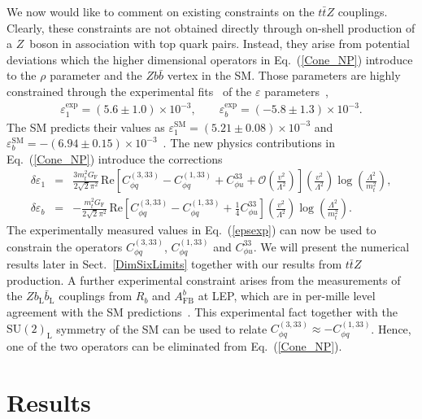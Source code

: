 \documentclass{JHEP3}
\def\ttbZ{t\bar{t}Z}
\newcommand{\be}{\begin{eqnarray}}
\newcommand{\ee}{\end{eqnarray}}
\begin{document}
We now would like to comment on existing constraints on the $\ttbZ$ couplings.
Clearly, these constraints are not obtained directly through on-shell production of a $Z$~boson in association with top quark pairs.
Instead, they arise from potential deviations which the higher dimensional operators in Eq.~(\ref{Cone_NP}) introduce to the $\rho$ parameter and the $Z b \bar{b}$ vertex in the SM.
Those parameters are highly constrained through the experimental fits~\cite{Ciuchini:2013pca} of the $\varepsilon$ parameters~\cite{Altarelli:1990zd,Altarelli:1991fk,Altarelli:1993sz},
\be
   \label{epsexp}
   \varepsilon_1^\mathrm{exp} = (5.6 \pm 1.0) \times 10^{-3}, \quad \quad \varepsilon_b^\mathrm{exp} = (-5.8 \pm 1.3) \times 10^{-3}.
\ee
The SM predicts their values as $\varepsilon_1^\mathrm{SM} = (5.21 \pm 0.08) \times 10^{-3} $ and
$\varepsilon_b^\mathrm{SM} = -(6.94 \pm 0.15) \times 10^{-3}$~\cite{Ciuchini:2013pca}.
The new physics contributions in Eq.~(\ref{Cone_NP}) introduce the corrections~\cite{Larios:1999au}
\be
   \delta \varepsilon_1 &=& \frac{3 m_t^2 G_\mathrm{F}}{2\sqrt{2}\pi^2}  
   \, \mathrm{Re}\left[  C^{(3,33)}_{\phi q}-C^{(1,33)}_{\phi q} + C^{33}_{\phi u} + \mathcal{O}\left(\frac{v^2}{\Lambda^2} \right) \right]
   \left( \frac{v^2}{\Lambda^2} \right) \log\left(\frac{\Lambda^2}{m_t^2}\right),
   \\
   \delta \varepsilon_b &=& -\frac{m_t^2 G_\mathrm{F}}{2\sqrt{2}\pi^2} 
   \, \mathrm{Re}\left[  C^{(3,33)}_{\phi q}-C^{(1,33)}_{\phi q} + \frac14 C^{33}_{\phi u}  \right]
   \left( \frac{v^2}{\Lambda^2} \right)\log\left(\frac{\Lambda^2}{m_t^2}\right).
\ee
The experimentally measured values in Eq.~(\ref{epsexp}) can now be used to constrain the operators 
$C^{(3,33)}_{\phi q}$,  $C^{(1,33)}_{\phi q}$ and $C^{33}_{\phi u}$.
We will present the numerical results later in Sect.~\ref{DimSixLimits} together with our results from $\ttbZ$ production.
A further experimental constraint arises from the measurements of the $Z b_\mathrm{L} \bar{b}_\mathrm{L}$ couplings from $R_b$ and $A^{b}_\mathrm{FB}$ at LEP, which are in per-mille level agreement with the SM predictions~\cite{Abdallah:2008ab}.
This experimental fact together with the $\mathrm{SU(2)_L}$ symmetry of the SM
can be used to relate $  C^{(3,33)}_{\phi q} \approx - C^{(1,33)}_{\phi q}$.
Hence, one of the two operators can be eliminated from Eq.~(\ref{Cone_NP}).




\section{Results}
\end{document}
